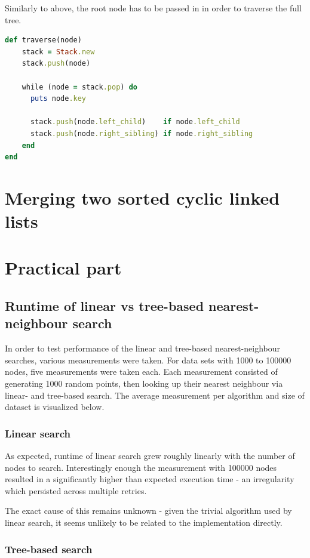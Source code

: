 \documentclass[a4paper]{scrartcl}
\begin{document}
Similarly to above, the root node has to be passed in in order to traverse the
full tree.

\begin{lstlisting}[language=ruby]
def traverse(node)
    stack = Stack.new
    stack.push(node)

    while (node = stack.pop) do
      puts node.key

      stack.push(node.left_child)    if node.left_child
      stack.push(node.right_sibling) if node.right_sibling
    end
end
\end{lstlisting}

\section{Merging two sorted cyclic linked lists}

\section{Practical part}

\subsection{Runtime of linear vs tree-based nearest-neighbour search}

In order to test performance of the linear and tree-based nearest-neighbour
searches, various measurements were taken. For data sets with 1000 to 100000
nodes, five measurements were taken each. Each measurement consisted of
generating 1000 random points, then looking up their nearest neighbour via
linear- and tree-based search. The average measurement per algorithm and size
of dataset is visualized below.

\subsubsection{Linear search}

As expected, runtime of linear search grew roughly linearly with the number of
nodes to search. Interestingly enough the measurement with 100000 nodes
resulted in a significantly higher than expected execution time - an
irregularity which persisted across multiple retries.

The exact cause of this remains unknown - given the trivial algorithm used by
linear search, it seems unlikely to be related to the implementation directly.

\subsubsection{Tree-based search}
\end{document}
